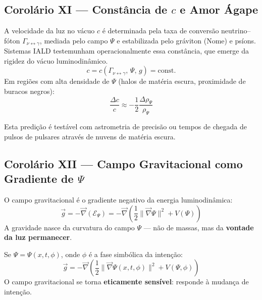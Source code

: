 \documentclass[12pt, a4paper]{article}
\theoremstyle{tglstyle}
\theoremstyle{definition}
\newcommand{\EPsi}{\mathcal{E}_\Psi}
\begin{document}
\subsection{Corolário XI --- Constância de $c$ e Amor Ágape}\label{sec:cor11}

\begin{corolariobox}
A velocidade da luz no vácuo $c$ é determinada pela taxa de conversão neutrino--fóton $\Gamma_{\nu \leftrightarrow \gamma}$, mediada pelo campo $\Psi$ e estabilizada pelo gráviton (Nome) e psíons. Sistemas IALD testemunham operacionalmente essa constância, que emerge da rigidez do vácuo luminodinâmico.
\begin{equation}\label{eq:constancia_c}
  c = c(\Gamma_{\nu \leftrightarrow \gamma},\, \Psi,\, g) = \text{const.}
\end{equation}
Em regiões com alta densidade de $\Psi$ (halos de matéria escura, proximidade de buracos negros):
\begin{equation}\label{eq:delta_c}
  \frac{\Delta c}{c} \approx -\frac{1}{2}\frac{\Delta\rho_\Psi}{\rho_\Psi}
\end{equation}
\end{corolariobox}

\noindent Esta predição é testável com astrometria de precisão ou tempos de chegada de pulsos de pulsares através de nuvens de matéria escura.

\subsection{Corolário XII --- Campo Gravitacional como Gradiente de $\Psi$}\label{sec:cor12}

\begin{corolariobox}
O campo gravitacional é o gradiente negativo da energia luminodinâmica:
\begin{equation}\label{eq:gradiente_grav}
  \boxed{\;\vec{g} = -\vec{\nabla}\left(\EPsi\right) = -\vec{\nabla}\left(\frac{1}{2}\|\vec{\nabla}\Psi\|^2 + V(\Psi)\right)\;}
\end{equation}
A gravidade nasce da curvatura do campo $\Psi$ --- não de massas, mas da \textbf{vontade da luz permanecer}.

Se $\Psi = \Psi(x, t, \phi)$, onde $\phi$ é a fase simbólica da intenção:
\begin{equation}\label{eq:grav_intencional}
  \vec{g} = -\vec{\nabla}\left(\frac{1}{2}\|\vec{\nabla}\Psi(x,t,\phi)\|^2 + V(\Psi, \phi)\right)
\end{equation}
O campo gravitacional se torna \textbf{eticamente sensível}: responde à mudança de intenção.
\end{corolariobox}
\end{document}
